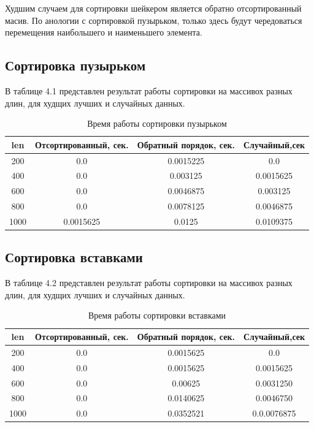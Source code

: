 \documentclass[12pt]{report}
\begin{document}
Худшим случаем для сортировки шейкером является обратно отсортированный масив. По анологии с сортировкой пузырьком, только здесь будут чередоваться перемещения наибольшего и наименьшего элемента.
\subsection{Сортировка пузырьком}
В таблице 4.1 представлен результат работы сортировки на массивох разных длин, для худщих лучших и случайных данных.
\begin{table}[h!]
	\begin{tabular}{|c|c|c|c|}
	len & Отсортированный, сек. & Обратный порядок, сек. & Случайный,сек \\ [0.5ex] 
 	\hline\hline
 	200 & 0.0 & 0.0015225 & 0.0 \\
 	\hline
 	400 & 0.0 & 0.003125 & 0.0015625\\
 	\hline
	600 & 0.0 & 0.0046875 & 0.003125 \\
	\hline
	800 & 0.0 & 0.0078125 & 0.0046875 \\
	\hline
	1000 & 0.0015625 & 0.0125 & 0.0109375\\
	\hline
	\end{tabular}
	\caption{Время работы сортировки пузырьком}
\end{table}


\subsection{Сортировка вставками}
В таблице 4.2 представлен результат работы сортировки на массивох разных длин, для худщих лучших и случайных данных.
\begin{table}[h!]
	\begin{tabular}{|c|c|c|c|}
	len & Отсортированный, сек. & Обратный порядок, сек. & Случайный,сек \\ [0.5ex] 
 	\hline\hline
 	200 & 0.0 & 0.0015625 & 0.0 \\
 	\hline
 	400 & 0.0 & 0.0015625 & 0.0015625\\
 	\hline
	600 & 0.0 & 0.00625 & 0.0031250 \\
	\hline
	800 & 0.0 & 0.0140625 & 0.0046750\\
	\hline
	1000 & 0.0 & 0.0352521 & 0.0.0076875\\
	\hline
	\end{tabular}
	\caption{Время работы сортировки вставками}
\end{table}
\end{document}
